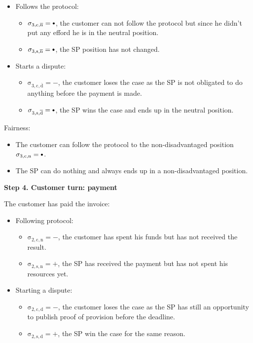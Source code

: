 \documentclass{ieeeaccess}
\newcommand\sbullet[1][.75]{\mathbin{\ThisStyle{\vcenter{\hbox{%
  \scalebox{#1}{$\SavedStyle\bullet$}}}}}%
}
\begin{document}
\begin{itemize}
\item
  Follows the protocol:

  \begin{itemize}
  
  \item
    \(\operatorname{\sigma_{3, c, \overline{n}} = \sbullet}\), the customer can not follow the protocol but since he didn't put any efford he is in the neutral position.
  \item
    \(\operatorname{\sigma_{3, s, \overline{n}} = \sbullet}\), the SP position has not changed.
  \end{itemize}
\item
  Starts a dispute:

  \begin{itemize}
  
  \item
    \(\operatorname{\sigma_{3, c, \overline{d}} = -}\), the customer loses the case as the SP is not obligated to do anything before the payment is made.
  \item
    \(\operatorname{\sigma_{3, s, \overline{d}} = \sbullet}\), the SP wins the case and ends up in the neutral position.
  \end{itemize}
\end{itemize}

Fairness:

\begin{itemize}

\item The customer can follow the protocol to the non-disadvantaged position \(\operatorname{\sigma_{3, c, n} = \sbullet}\).
\item The SP can do nothing and always ends up in a non-disadvantaged position.
\end{itemize}



\noindent \textbf
{Step 4. Customer turn: payment}

The customer has paid the invoice:

\begin{itemize}
\item
  Following protocol:
  \begin{itemize}
  \item
    \(\operatorname{\sigma_{2, c, n} = -}\), the customer has spent his funds but has not received the result.
  \item
    \(\operatorname{\sigma_{2, s, n} = +}\), the SP has received the payment but has not spent his resources yet.
  \end{itemize}
\item
  Starting a dispute:

  \begin{itemize}
  \item
    \(\operatorname{\sigma_{2, c, d} = -}\), the customer loses the case as the SP has still an opportunity to publish proof of provision before the deadline.
  \item
    \(\operatorname{\sigma_{2, s, d} = +}\), the SP win the case for the same reason.
  \end{itemize}
\end{itemize}
\end{document}
